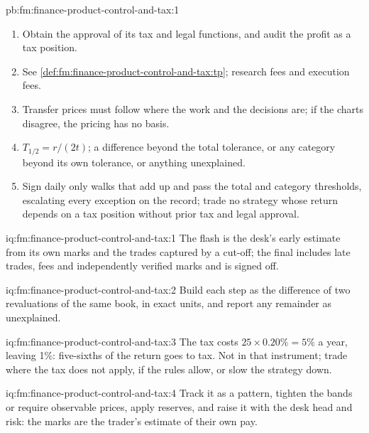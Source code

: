 \begin{solution}{pb:fm:finance-product-control-and-tax:1}
\begin{enumerate}
authority was not shown to have been misled.
\item Obtain the approval of its tax and legal functions, and audit the profit as a tax position.
\item See \cref{def:fm:finance-product-control-and-tax:tp}; research fees and execution fees.
\item Transfer prices must follow where the work and the decisions are; if the charts disagree, the pricing has no basis.
\item $T_{1/2}=r/(2t)$; a difference beyond the total tolerance, or any category beyond its own tolerance, or anything unexplained.
\item Sign daily only walks that add up and pass the total and category thresholds, escalating every exception on the record; trade no strategy whose
return depends on a tax position without prior tax and legal approval.
\end{enumerate}
\end{solution}

\begin{solution}{iq:fm:finance-product-control-and-tax:1}
The flash is the desk's early estimate from its own marks and the trades captured by a cut-off; the final includes late trades, fees and
independently verified marks and is signed off.
\end{solution}

\begin{solution}{iq:fm:finance-product-control-and-tax:2}
Build each step as the difference of two revaluations of the same book, in exact units, and report any remainder as unexplained.
\end{solution}

\begin{solution}{iq:fm:finance-product-control-and-tax:3}
The tax costs $25\times0.20\%=5\%$ a year, leaving 1\%: five-sixths of the return goes to tax. Not in that instrument; trade where the tax does
not apply, if the rules allow, or slow the strategy down.
\end{solution}

\begin{solution}{iq:fm:finance-product-control-and-tax:4}
Track it as a pattern, tighten the bands or require observable prices, apply reserves, and raise it with the desk head and risk: the marks are
the trader's estimate of their own pay.
\end{solution}

